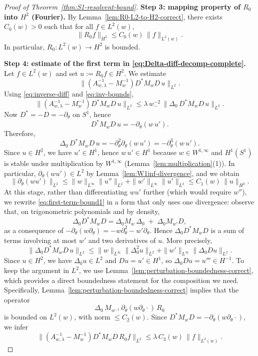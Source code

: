 \documentclass{amsart}
\numberwithin{equation}{section}
\theoremstyle{definition}
\theoremstyle{remark}
\begin{document}
\begin{proof}[Proof of Theorem~\ref{thm:S1-resolvent-bound}]
\medskip
\noindent\textbf{Step 3: mapping property of $R_0$ into $H^2$ (Fourier).}
By Lemma~\ref{lem:R0-L2-to-H2-correct}, there exists $C_0(w)>0$ such that for all $f\in L^2(w)$,
\begin{equation}\label{eq:R0H2}
\|R_0 f\|_{H^2}\le C_0(w)\,\|f\|_{L^2(w)}.
\end{equation}
In particular, $R_0:L^2(w)\to H^2$ is bounded.

\medskip
\noindent\textbf{Step 4: estimate of the first term in \eqref{eq:Delta-diff-decomp-complete}.}
Let $f\in L^2(w)$ and set $u:=R_0 f\in H^2$.
We estimate
\[
\|(A_{w,\lambda}^{-1}-M_w^{-1})D^*M_wD\,u\|_{L^2}.
\]
Using \eqref{eq:inverse-diff} and \eqref{eq:inv-bounds},
\begin{equation}\label{eq:first-term-bound1}
\|(A_{w,\lambda}^{-1}-M_w^{-1})D^*M_wD\,u\|_{L^2}
\le
\lambda\,w_-^{-2}\,\|\Delta_0\,D^*M_wD\,u\|_{L^2}.
\end{equation}
Now $D^*=-D=-\partial_\theta$ on $S^1$, hence
\[
D^*M_wD\,u
=
-\partial_\theta(w\,u').
\]
Therefore,
\[
\Delta_0\,D^*M_wD\,u
=
-\partial_\theta^2\partial_\theta(w\,u')
=
-\partial_\theta^3(w\,u').
\]
Since $u\in H^2$, we have $u'\in H^1$, hence $w\,u'\in H^1$ because $w\in W^{1,\infty}$
and $H^1(S^1)$ is stable under multiplication by $W^{1,\infty}$ (Lemma~\ref{lem:multiplication}(1)).
In particular, $\partial_\theta(wu')\in L^2$ by Lemma~\ref{lem:W1inf-divergence}, and we obtain
\begin{equation}\label{eq:div-bound}
\|\partial_\theta(wu')\|_{L^2}
\le
\|w\|_{L^\infty}\|u''\|_{L^2}+\|w'\|_{L^\infty}\|u'\|_{L^2}
\le C_1(w)\,\|u\|_{H^2}.
\end{equation}
At this stage, rather than differentiating $wu'$ further (which would require $w''$),
we rewrite \eqref{eq:first-term-bound1} in a form that only uses one divergence:
observe that, on trigonometric polynomials and by density,
\[
\Delta_0 D^*M_wD
=
\Delta_0 M_w\,\Delta_0
\;+\;
\Delta_0 M_{w'}D,
\]
as a consequence of $-\partial_\theta(w\partial_\theta)= -w\partial_\theta^2-w'\partial_\theta$.
Hence $\Delta_0 D^*M_wD$ is a sum of terms involving at most $w'$ and two derivatives of $u$.
More precisely,
\[
\|\Delta_0 D^*M_wD\,u\|_{L^2}
\le
\|w\|_{L^\infty}\|\Delta_0^2u\|_{L^2}+\|w'\|_{L^\infty}\|\Delta_0Du\|_{L^2}.
\]
Since $u\in H^2$, we have $\Delta_0 u\in L^2$ and $Du=u'\in H^1$, so $\Delta_0Du=u'''\in H^{-1}$.
To keep the argument in $L^2$, we use Lemma~\ref{lem:perturbation-boundedness-correct}, which provides
a direct boundedness statement for the composition we need.
Specifically, Lemma~\ref{lem:perturbation-boundedness-correct} implies that the operator
\[
\Delta_0\,M_{w^{-1}}\,\partial_\theta(w\partial_\theta\cdot)\,R_0
\]
is bounded on $L^2(w)$, with norm $\le C_2(w)$.
Since $D^*M_wD=-\partial_\theta(w\partial_\theta\cdot)$, we infer
\begin{equation}\label{eq:first-term-final}
\|(A_{w,\lambda}^{-1}-M_w^{-1})D^*M_wD\,R_0 f\|_{L^2}
\le
\lambda\,C_3(w)\,\|f\|_{L^2(w)}.
\end{equation}


\end{proof}
\end{document}
